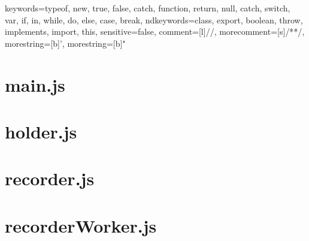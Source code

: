 {
  keywords={typeof, new, true, false, catch, function, return, null, catch, switch, var, if, in, while, do, else, case, break},
  ndkeywords={class, export, boolean, throw, implements, import, this},
  sensitive=false,
  comment=[l]{//},
  morecomment=[s]{/*}{*/},
  morestring=[b]',
  morestring=[b]"
}

	\section{main.js}
	
	
	\section{holder.js}
	
	
	\section{recorder.js}
	
	
	\section{recorderWorker.js}
	